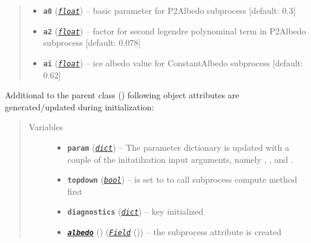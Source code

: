 \documentclass[a4paper,10pt,english]{sphinxmanual}
\begin{document}
\begin{fulllineitems}
\begin{quote}
\begin{description}
\begin{itemize}
\begin{itemize}
\end{itemize}


\item {} 
\textbf{\texttt{a0}} (\href{http://docs.python.org/2.7/library/functions.html\#float}{\emph{\texttt{float}}}) -- basic parameter for P2Albedo subprocess {[}default: 0.3{]}

\item {} 
\textbf{\texttt{a2}} (\href{http://docs.python.org/2.7/library/functions.html\#float}{\emph{\texttt{float}}}) -- factor for second legendre polynominal term in P2Albedo
subprocess {[}default: 0.078{]}

\item {} 
\textbf{\texttt{ai}} (\href{http://docs.python.org/2.7/library/functions.html\#float}{\emph{\texttt{float}}}) -- ice albedo value for ConstantAlbedo subprocess
{[}default: 0.62{]}

\end{itemize}

\end{description}\end{quote}

Additional to the parent class 
{\hyperref[api/climlab.process:climlab.process.diagnostic.DiagnosticProcess]{\emph{}}} ()
following object attributes are generated/updated during initialization:
\begin{quote}\begin{description}
\item[{Variables}] \leavevmode\begin{itemize}
\item {} 
\textbf{\texttt{param}} (\href{http://docs.python.org/2.7/library/stdtypes.html\#dict}{\emph{\texttt{dict}}}) -- The parameter dictionary is updated with 
a couple of the initatilzation input 
arguments, namely , , 
 and .

\item {} 
\textbf{\texttt{topdown}} (\href{http://docs.python.org/2.7/library/functions.html\#bool}{\emph{\texttt{bool}}}) -- is set to  to call subprocess
compute method first

\item {} 
\textbf{\texttt{diagnostics}} (\href{http://docs.python.org/2.7/library/stdtypes.html\#dict}{\emph{\texttt{dict}}}) -- key  initialized

\item {} 
{\hyperref[api/climlab.surface:climlab.surface.albedo.P2Albedo.albedo]{\emph{\textbf{\texttt{albedo}}}}} () ({\hyperref[api/climlab.domain:climlab.domain.field.Field]{\emph{\emph{\texttt{Field}}}}} ()) -- the subprocess attribute  is
created


\end{itemize}
\end{description}
\end{quote}
\end{fulllineitems}
\end{document}
